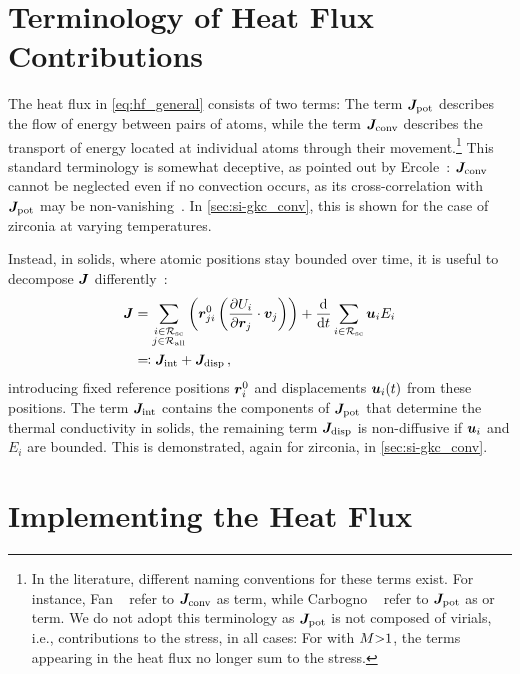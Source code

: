 \section{Terminology of Heat Flux Contributions}
\label{sec:hf_terms}

The heat flux in \cref{eq:hf_general} consists of two terms: The  term $\boldsymbol{J}_\text{pot}$ describes the flow of energy between pairs of atoms, while the  term $\boldsymbol{J}_\text{conv}$ describes the transport of energy located at individual atoms through their movement.\footnote{In the literature, different naming conventions for these terms exist. For instance, Fan \etal~\cite{fpdh2015t} refer to $\boldsymbol{J}_\text{conv}$ as  term, while Carbogno \etal~\cite{crs2017t} refer to $\boldsymbol{J}_\text{pot}$ as  or  term. We do not adopt this terminology as $\boldsymbol{J}_\text{pot}$ is not composed of virials, i.e., contributions to the stress, in all cases: For \glps with $M{>}1$, the terms appearing in the heat flux no longer sum to the stress.
} This standard terminology is somewhat deceptive, as pointed out by Ercole~\cite{e2018t}: $\boldsymbol{J}_\text{conv}$ cannot be neglected even if no convection occurs, as its cross-correlation with $\boldsymbol{J}_\text{pot}$ may be non-vanishing~\cite{mk2006t}. In \cref{sec:si-gkc_conv}, this is shown for the case of zirconia at varying temperatures.

Instead, in solids, where atomic positions stay bounded over time, it is useful to decompose $\boldsymbol{J}$ differently~\cite{lmh1986t,ibdb2019t}:
\begin{align}
	\J &=
		\sum_{\substack{i \in \Rsc \\ j \in \Rall}} \left(\Rr_{ji} \left(\dur{i}{j}{} \cdot \V_j\right) \right)
		+ \totaldiff{t} \sum_{i \in \Rsc} \U_i E_i \\
		&\defdas \Jint + \Jdiff \, , \label{eq:hf_jfull}
\end{align}
introducing fixed reference positions $\boldsymbol{r}^0_i$ and displacements $\boldsymbol{u}_i(t)$ from these positions.
The  term $\boldsymbol{J}_\text{int}$ contains the components of $\boldsymbol{J}_\text{pot}$ that determine the thermal conductivity in solids, the remaining  term $\boldsymbol{J}_\text{disp}$ is non-diffusive if $\boldsymbol{u}_i$ and $E_i$ are bounded. This is demonstrated, again for zirconia, in \cref{sec:si-gkc_conv}.

\section{Implementing the Heat Flux}
\label{sec:hf_imp}

